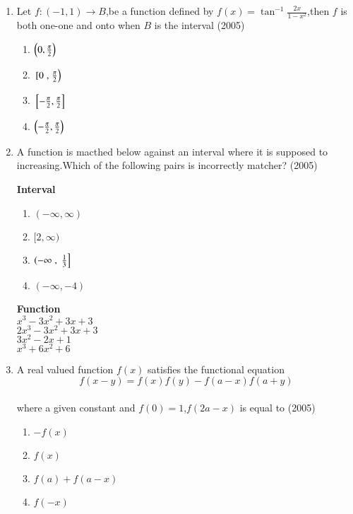 \documentclass[journal,12pt,twocolumn]{IEEEtran}
\theoremstyle{remark}
\begin{document}
\begin{enumerate}[start=4]
      \item Let $f:(-1,1) \to B$,be a function defined by  $f(x)=\tan^{-1}\frac{2x}{1-x^{2}}$,then $f$ is both one-one and onto when $B$ is the interval \hfill(2005)
             \begin{enumerate}
		     \item $\left(0,\frac{\pi}{2}\right)$ \\
		     \item ${}\left[0\right.,\left.\frac{\pi}{2}\right)$ \\
		     \item ${}\left[-\frac{\pi}{2},\frac{\pi}{2}\right]$ \\
		     \item $\left(-\frac{\pi}{2},\frac{\pi}{2}\right)$
	     \end{enumerate}
     \item A function is macthed below against an interval where it is supposed to increasing.Which of the following pairs is incorrectly matcher? \hfill(2005)
	     \begin{multicols}{2}
		     \textbf{Interval}
                     \begin{enumerate}
                        \item $(-\infty,\infty)$
                        \item $[2,\infty)$
			\item $\left(-\infty\right.,{}\left.\frac{1}{3}\right]$
                        \item $(-\infty,-4)$
                     \end{enumerate}

                  \columnbreak

                    \textbf{Function}\\
                      $x^{3} - 3x^{2} + 3x + 3$\\
                      $2x^{3} - 3x^{2} + 3x + 3$\\
                      $3x^{2} - 2x + 1$\\
                      $x^{3} + 6x^{2} + 6$\\
	     \end{multicols}

     \item A real valued function $f(x)$ satisfies the functional equation $$f(x-y)=f(x)f(y)-f(a-x)f(a+y)$$\\
	     where a given constant and $f(0)=1$,$f(2a-x)$ is equal to \hfill(2005)
	     \begin{enumerate}
		     \item $-f(x)$
		     \item $f(x)$
		     \item $f(a)+f(a-x)$
		     \item $f(-x)$
	     \end{enumerate}


\end{enumerate}
\end{document}
